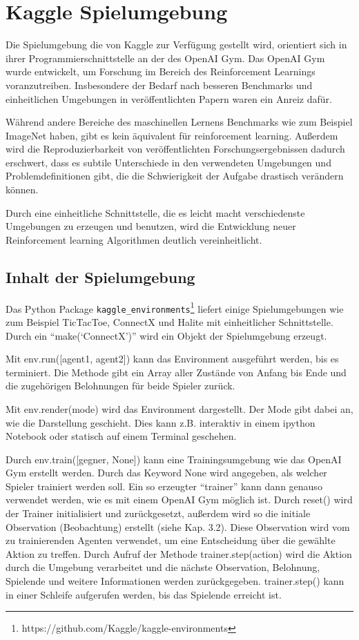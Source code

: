 \section{Kaggle Spielumgebung}

Die Spielumgebung die von Kaggle zur Verfügung gestellt wird, orientiert sich in ihrer Programmierschnittstelle an der des OpenAI Gym. Das OpenAI Gym wurde entwickelt, um Forschung im Bereich des Reinforcement Learnings voranzutreiben. Insbesondere der Bedarf nach besseren Benchmarks und einheitlichen Umgebungen in veröffentlichten Papern waren ein Anreiz dafür.
\par
Während andere Bereiche des maschinellen Lernens Benchmarks wie zum Beispiel ImageNet haben, gibt es kein äquivalent für reinforcement learning. Außerdem wird die Reproduzierbarkeit von veröffentlichten Forschungsergebnissen dadurch erschwert, dass es subtile Unterschiede in den verwendeten Umgebungen und Problemdefinitionen gibt, die die Schwierigkeit der Aufgabe drastisch verändern können.
\par
Durch eine einheitliche Schnittstelle, die es leicht macht verschiedenste Umgebungen zu erzeugen und benutzen, wird die Entwicklung neuer Reinforcement learning Algorithmen deutlich vereinheitlicht.

\subsection{Inhalt der Spielumgebung}
Das Python Package \texttt{kaggle\_environments}\footnote{https://github.com/Kaggle/kaggle-environments} liefert einige Spielumgebungen wie zum Beispiel TicTacToe, ConnectX und Halite mit einheitlicher Schnittstelle. Durch ein “make(‘ConnectX’)” wird ein Objekt der Spielumgebung erzeugt.
\par
Mit env.run([agent1, agent2]) kann das Environment ausgeführt werden, bis es terminiert. Die Methode gibt ein Array aller Zustände von Anfang bis Ende und die zugehörigen Belohnungen für beide Spieler zurück. 
\par
Mit env.render(mode) wird das Environment dargestellt. Der Mode gibt dabei an, wie die Darstellung geschieht. Dies kann z.B. interaktiv in einem ipython Notebook oder statisch auf einem Terminal geschehen.
\par
Durch env.train([gegner, None]) kann eine Trainingsumgebung wie das OpenAI Gym erstellt werden. Durch das Keyword None wird angegeben, als welcher Spieler trainiert werden soll. Ein so erzeugter “trainer” kann dann genauso verwendet werden, wie es mit einem OpenAI Gym möglich ist. Durch reset() wird der Trainer initialisiert und zurückgesetzt, außerdem wird so die initiale Observation (Beobachtung) erstellt (siehe Kap. 3.2). Diese Observation wird vom zu trainierenden Agenten verwendet, um eine Entscheidung über die gewählte Aktion zu treffen. Durch Aufruf der Methode trainer.step(action) wird die Aktion durch die Umgebung verarbeitet und die nächste Observation, Belohnung, Spielende und weitere Informationen werden zurückgegeben. trainer.step() kann in einer Schleife aufgerufen werden, bis das Spielende erreicht ist.

